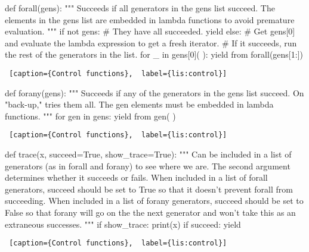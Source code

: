 \begin{minipage}{\linewidth}  \largev \hrulefill
\begin{python}[numbers=left]
def forall(gens):
  """
  Succeeds if all generators in the gens list succeed. The elements in the gens list
  are embedded in lambda functions to avoid premature evaluation.
  """
  if not gens:
    # They have all succeeded.
    yield
  else:
    # Get gens[0] and evaluate the lambda expression to get a fresh iterator.
    # If it succeeds, run the rest of the generators in the list.
    for _ in gens[0]( ):
      yield from forall(gens[1:])
\end{python}
\begin{lstlisting} [caption={Control functions},  label={lis:control}]
\end{lstlisting}
\end{minipage}

\begin{minipage}{\linewidth}  \largev \hrulefill
\begin{python}[numbers=left]
def forany(gens):
  """
  Succeeds if any of the generators in the gens list succeed. On "back-up," tries them all. 
  The gen elements must be embedded in lambda functions.
  """
  for gen in gens:
    yield from gen( )

\end{python}
\begin{lstlisting} [caption={Control functions},  label={lis:control}]
\end{lstlisting}
\end{minipage}

\begin{minipage}{\linewidth}  \largev \hrulefill
\begin{python}[numbers=left]
def trace(x, succeed=True, show_trace=True):
  """
  Can be included in a list of generators (as in forall and forany) to see where we are.
  The second argument determines whether it succeeds or fails.
  When included in a list of forall generators, succeed should be set to True so that
  it doesn't prevent forall from succeeding.
  When included in a list of forany generators, succeed should be set to False so that forany
  will go on the the next generator and won't take this as an extraneous successes.
  """
  if show_trace:
    print(x)
  if succeed:
    yield

\end{python}
\begin{lstlisting} [caption={Control functions},  label={lis:control}]
\end{lstlisting}
\end{minipage}

